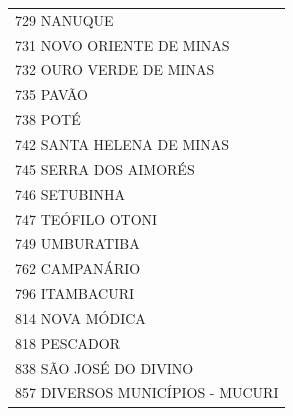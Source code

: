 \documentclass{article}
\begin{document}
\begin{longtable}[c]{m{18cm}}
\multicolumn{1}{l}{ \hspace{2em} 729 NANUQUE } \\
\multicolumn{1}{l}{ \hspace{2em} 731 NOVO ORIENTE DE MINAS } \\
\multicolumn{1}{l}{ \hspace{2em} 732 OURO VERDE DE MINAS } \\
\multicolumn{1}{l}{ \hspace{2em} 735 PAVÃO } \\
\multicolumn{1}{l}{ \hspace{2em} 738 POTÉ } \\
\multicolumn{1}{l}{ \hspace{2em} 742 SANTA HELENA DE MINAS } \\
\multicolumn{1}{l}{ \hspace{2em} 745 SERRA DOS AIMORÉS } \\
\multicolumn{1}{l}{ \hspace{2em} 746 SETUBINHA } \\
\multicolumn{1}{l}{ \hspace{2em} 747 TEÓFILO OTONI } \\
\multicolumn{1}{l}{ \hspace{2em} 749 UMBURATIBA } \\
\multicolumn{1}{l}{ \hspace{2em} 762 CAMPANÁRIO } \\
\multicolumn{1}{l}{ \hspace{2em} 796 ITAMBACURI } \\
\multicolumn{1}{l}{ \hspace{2em} 814 NOVA MÓDICA } \\
\multicolumn{1}{l}{ \hspace{2em} 818 PESCADOR } \\
\multicolumn{1}{l}{ \hspace{2em} 838 SÃO JOSÉ DO DIVINO } \\
\multicolumn{1}{l}{ \hspace{2em} 857 DIVERSOS MUNICÍPIOS - MUCURI } \\
\end{longtable}
\newpage
\end{document}
